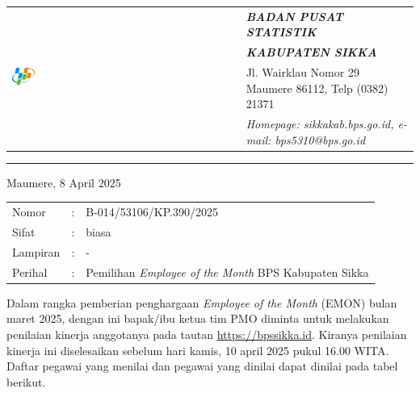 \documentclass{article}
\begin{document}




\begin{tabular}{ll}
   \multirow{4}{*}{\includegraphics[width=0.10\textwidth]{logo/bps-logo.png}} %
   &
   \large{\textbf{\textit{BADAN PUSAT STATISTIK}}} \\
   & \large{\textbf{\textit{KABUPATEN SIKKA}}} \\
   & Jl. Wairklau Nomor 29 Maumere 86112, Telp (0382) 21371 \\
   & \textit{Homepage: sikkakab.bps.go.id, e-mail: bps5310@bps.go.id} \\
\end{tabular}

\hfill

\vspace{-1em} %

\rule{\linewidth}{1pt} %


\hfill
Maumere, 8 April 2025

\begin{tabular}{@{} lcl}
	Nomor&:&B-014/53106/KP.390/2025 \\
	Sifat&:&biasa \\
	Lampiran&:&-\\
    Perihal&:& Pemilihan \textit{Employee of the Month} BPS Kabupaten Sikka\\
\end{tabular}

\bigskip %

Dalam rangka pemberian penghargaan \textit{Employee of the Month} (EMON) bulan maret 2025, dengan ini bapak/ibu ketua tim PMO diminta untuk melakukan penilaian kinerja anggotanya pada tautan \href{https://bpssikka.id/}{https://bpssikka.id}.
Kiranya penilaian kinerja ini diselesaikan sebelum hari kamis, 10 april 2025 pukul 16.00 WITA.
Daftar pegawai yang menilai dan pegawai yang dinilai dapat dinilai pada tabel berikut.
\end{document}
